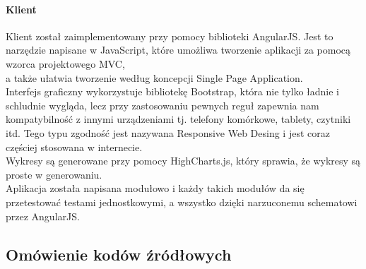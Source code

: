 \documentclass[10pt,titlepage]{article}
\begin{document}
\paragraph{Klient}
Klient został zaimplementowany przy pomocy biblioteki AngularJS. Jest to narzędzie napisane w JavaScript, które umożliwa tworzenie aplikacji za pomocą wzorca projektowego MVC,\\ a także ułatwia tworzenie według koncepcji Single Page Application.\\ Interfejs graficzny wykorzystuje bibliotekę Bootstrap, która nie tylko ładnie i schludnie wygląda, lecz przy zastosowaniu pewnych reguł zapewnia nam kompatybilność z innymi urządzeniami tj. telefony komórkowe, tablety, czytniki itd. Tego typu zgodność jest nazywana Responsive Web Desing i jest coraz częściej stosowana w internecie.\\ Wykresy są generowane przy pomocy HighCharts.js, który sprawia, że wykresy są proste w generowaniu.\\ Aplikacja została napisana modułowo i każdy takich modułów da się przetestować testami jednostkowymi, a wszystko dzięki narzuconemu schematowi przez AngularJS.
\subsection{Omówienie kodów źródłowych}
\end{document}
